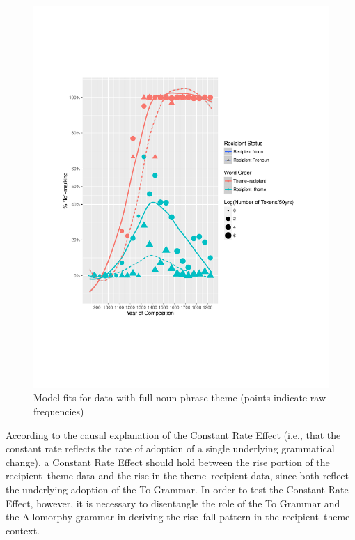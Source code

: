 	\begin{figure}
		\includegraphics[width=\linewidth]{../images/brit-tn}
		\caption{Model fits for data with full noun phrase theme (points indicate raw frequencies)}
		\label{fig:brit-tn}
	\end{figure}
	
	According to the causal explanation of the Constant Rate Effect (i.e., that the constant rate reflects the rate of adoption of a single underlying grammatical change), a Constant Rate Effect should hold between the rise portion of the recipient--theme data and the rise in the theme--recipient data, since both reflect the underlying adoption of the To Grammar. In order to test the Constant Rate Effect, however, it is necessary to disentangle the role of the To Grammar and the Allomorphy grammar in deriving the rise--fall pattern in the recipient--theme context. 

